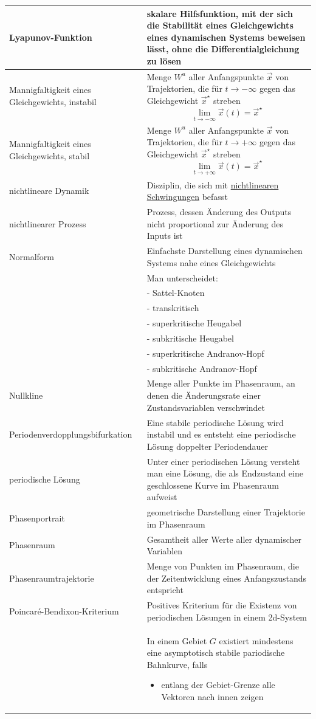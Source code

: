 \documentclass{article}
\begin{document}
\begin{xltabular}{\linewidth}{p{6cm}|X}
	\hline
		Lyapunov-Funktion & skalare Hilfsfunktion, mit der sich die Stabilität eines Gleichgewichts eines dynamischen Systems beweisen lässt, ohne die Differentialgleichung zu lösen \\
	\hline
		Mannigfaltigkeit eines Gleichgewichts, instabil & Menge $W^u$ aller Anfangspunkte $\vec{x}$ von Trajektorien, die für $t \to -\infty$ gegen das Gleichgewicht $\vec{x}^\star$ streben
			$$\lim_{t \to -\infty}\vec{x}(t) = \vec{x}^\star$$ \\
	\hline
		Mannigfaltigkeit eines Gleichgewichts, stabil & Menge $W^u$ aller Anfangspunkte $\vec{x}$ von Trajektorien, die für $t \to +\infty$ gegen das Gleichgewicht $\vec{x}^\star$ streben
			$$\lim_{t \to +\infty}\vec{x}(t) = \vec{x}^\star$$ \\
	\hline
		nichtlineare Dynamik & Disziplin, die sich mit \underline{nichtlinearen} \underline{Schwingungen} befasst \\
	\hline
		nichtlinearer Prozess & Prozess, dessen Änderung des Outputs nicht proportional zur Änderung des Inputs ist \\
	\hline
		Normalform & Einfachste Darstellung eines dynamischen Systems nahe eines Gleichgewichts \\
		& Man unterscheidet: \\
		& - Sattel-Knoten \\
		& - transkritisch \\
		& - superkritische Heugabel \\
		& - subkritische Heugabel \\
		& - superkritische Andranov-Hopf \\
		& - subkritische Andranov-Hopf \\
	\hline
		Nullkline & Menge aller Punkte im Phasenraum, an denen die Änderungsrate einer Zustandsvariablen verschwindet \\
	\hline
		Periodenverdopplungsbifurkation & Eine stabile periodische Lösung wird instabil und es entsteht eine periodische Lösung doppelter Periodendauer \\
	\hline
		periodische Lösung & Unter einer periodischen Lösung versteht man eine Lösung, die als Endzustand eine geschlossene Kurve im Phasenraum aufweist \\
	\hline
		Phasenportrait & geometrische Darstellung einer Trajektorie im Phasenraum \\
	\hline
		Phasenraum & Gesamtheit aller Werte aller dynamischer Variablen \\
	\hline
		Phasenraumtrajektorie & Menge von Punkten im Phasenraum, die der Zeitentwicklung eines Anfangszustands entspricht \\
	\hline
		Poincaré-Bendixon-Kriterium & Positives Kriterium für die Existenz von periodischen Lösungen in einem 2d-System \\
		& {\color{gruen}
				In einem Gebiet $G$ existiert mindestens eine asymptotisch stabile pariodische Bahnkurve, falls
				\begin{itemize}
					\item entlang der Gebiet-Grenze alle Vektoren nach innen zeigen
			

\end{itemize}}
\end{xltabular}
\end{document}
